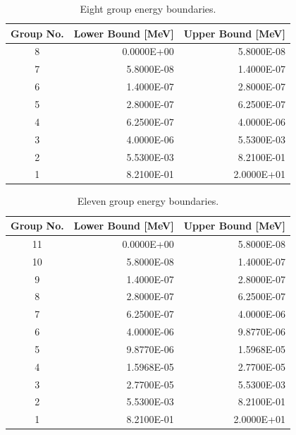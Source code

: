 \begin{appendices}
\begin{table}[h!]
  \centering
  \footnotesize
  \caption{Eight group energy boundaries.}
  \label{table:app-8-groups} 
  \vspace{14pt}
  \begin{tabular}{c r r}
    \toprule
    {\bf Group No.} &
    {\bf Lower Bound [MeV]} &
    {\bf Upper Bound [MeV]} \\
    \midrule
8 & 0.0000E+00 & 5.8000E-08 \\
7 & 5.8000E-08 & 1.4000E-07 \\
6 & 1.4000E-07 & 2.8000E-07 \\
5 & 2.8000E-07 & 6.2500E-07 \\
4 & 6.2500E-07 & 4.0000E-06 \\
3 & 4.0000E-06 & 5.5300E-03 \\
2 & 5.5300E-03 & 8.2100E-01 \\
1 & 8.2100E-01 & 2.0000E+01 \\
  \bottomrule
 \end{tabular}
\end{table}

\begin{table}[h!]
	\centering
	\footnotesize
	\caption{Eleven group energy boundaries.}
	\label{table:app-11-groups} 
	\vspace{14pt}
	\begin{tabular}{c r r}
		\toprule
		{\bf Group No.} &
		{\bf Lower Bound [MeV]} &
		{\bf Upper Bound [MeV]} \\
		\midrule
		11 & 0.0000E+00 & 5.8000E-08 \\
		10 & 5.8000E-08 & 1.4000E-07 \\
		9 & 1.4000E-07 & 2.8000E-07 \\
		8 & 2.8000E-07 & 6.2500E-07 \\
		7 & 6.2500E-07 & 4.0000E-06 \\
		6 & 4.0000E-06 & 9.8770E-06 \\
		5 & 9.8770E-06 & 1.5968E-05 \\
		4 & 1.5968E-05 & 2.7700E-05 \\
		3 & 2.7700E-05 & 5.5300E-03 \\
		2 & 5.5300E-03 & 8.2100E-01 \\
		1 & 8.2100E-01 & 2.0000E+01 \\
		\bottomrule
	\end{tabular}
\end{table}


\end{appendices}

